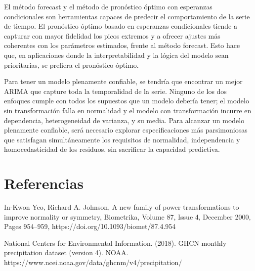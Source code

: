 \documentclass[12pt,letterpaper]{article}   %
\begin{document}
 El método forecast y el método de pronóstico óptimo con esperanzas condicionales son herramientas capaces de predecir el comportamiento de la serie de tiempo. El pronóstico óptimo basado en esperanzas condicionales tiende a capturar con mayor fidelidad los picos extremos y a ofrecer ajustes más coherentes con los parámetros estimados, frente al método forecast. Esto hace que, en aplicaciones donde la interpretabilidad y la lógica del modelo sean prioritarias, se prefiera el pronóstico óptimo.


Para tener un modelo plenamente confiable, se tendría que encontrar un mejor ARIMA que capture toda la temporalidad de la serie. Ninguno de los dos enfoques cumple con todos los supuestos que un modelo debería tener; el modelo sin transformación falla en normalidad y el modelo con transformación incurre en dependencia, heterogeneidad de varianza, y su media. Para alcanzar un modelo plenamente confiable, será necesario explorar especificaciones más parsimoniosas que satisfagan simultáneamente los requisitos de normalidad, independencia y homocedasticidad de los residuos, sin sacrificar la capacidad predictiva.






\newpage
\section{Referencias}


In‐Kwon Yeo, Richard A. Johnson, A new family of power transformations to improve normality or symmetry, Biometrika, Volume 87, Issue 4, December 2000, Pages 954–959, https://doi.org/10.1093/biomet/87.4.954

National Centers for Environmental Information. (2018). GHCN monthly precipitation dataset (version 4). NOAA. https://www.ncei.noaa.gov/data/ghcnm/v4/precipitation/
\end{document}
